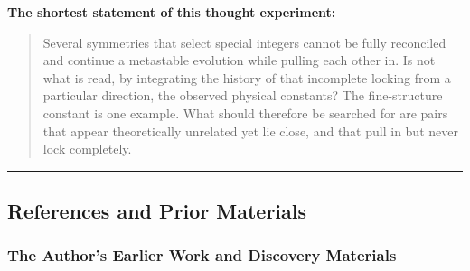 \documentclass[
  a4paper,
]{article}
\begin{document}
\textbf{The shortest statement of this thought experiment:}

\begin{quote}
Several symmetries that select special integers cannot be fully
reconciled and continue a metastable evolution while pulling each other
in. Is not what is read, by integrating the history of that incomplete
locking from a particular direction, the observed physical constants?
The fine-structure constant is one example. What should therefore be
searched for are pairs that appear theoretically unrelated yet lie
close, and that pull in but never lock completely.
\end{quote}

\begin{center}\rule{0.5\linewidth}{0.5pt}\end{center}

\subsection{References and Prior
Materials}\label{references-and-prior-materials}

\subsubsection{The Author's Earlier Work and Discovery
Materials}\label{the-authors-earlier-work-and-discovery-materials}
\end{document}
